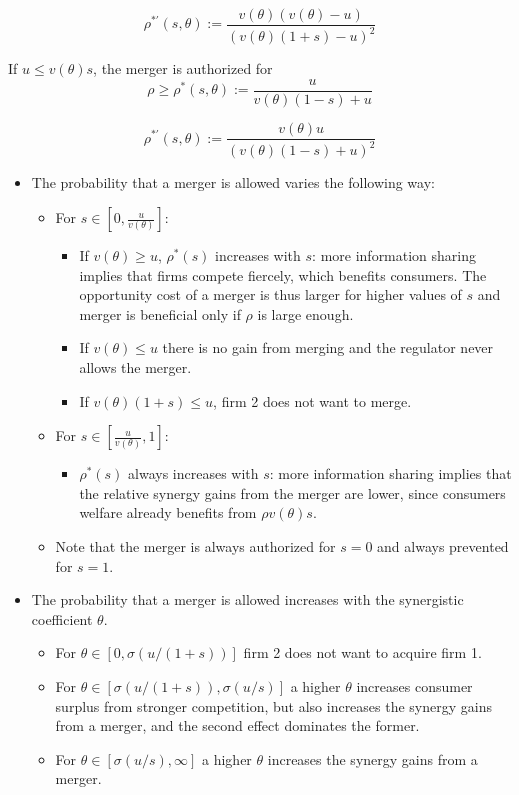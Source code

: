 \documentclass[a4paper,leqno]{article}%
\renewcommand{\t}{\theta}
\newcommand{\s}{\sigma}
\begin{document}
\[
\rho^{*'}(s,\t):=\frac{v(\t)(v(\t)-u)}{(v(\t)(1+s)-u)^2}
\]
    
If $u\leq v(\t)s$, the merger is authorized for 
    \begin{equation}
           \rho\geq \rho^*(s,\t):=\frac{u}{v(\t)(1-s)+u}
    \end{equation}


\[
\rho^{*'}(s,\t):=\frac{v(\t)u}{(v(\t)(1-s)+u)^2}
\]


\begin{itemize}
    \item The probability that a merger is allowed varies the following way:
    \begin{itemize}
        \item For $s\in[0,\frac{u}{v(\t)}]$:
        \begin{itemize}
            \item If $v(\t)\geq u$, $\rho^*(s)$ increases with $s$: more information sharing implies that firms compete fiercely, which benefits consumers. The opportunity cost of a merger is thus larger for higher values of $s$ and merger is beneficial only if $\rho$ is large enough.
            \item If $v(\t)\leq u$ there is no gain from merging and the regulator never allows the merger.
            \item If $v(\t)(1+s)\leq u$, firm 2 does not want to merge.
        \end{itemize}
        \item For $s\in[\frac{u}{v(\t)},1]$:
        \begin{itemize}
            \item $\rho^*(s)$ always increases with $s$: more information sharing implies that the relative synergy gains from the merger are lower, since consumers welfare already benefits from $\rho v(\t)s$.
        \end{itemize}
        \item Note that the merger is always authorized for $s=0$ and always prevented for $s=1$.
    \end{itemize} 
    \item The probability that a merger is allowed increases with the synergistic coefficient $\t$. 
    \begin{itemize}
        \item For $\t\in[0,\s(u/(1+s))]$ firm 2 does not want to acquire firm 1.
        \item For $\t\in[\s(u/(1+s)),\s(u/s)]$ a higher $\t$ increases consumer surplus from stronger competition, but also increases the synergy gains from a merger, and the second effect dominates the former.
        \item For $\t\in[\s(u/s),\infty]$ a higher $\t$ increases the synergy gains from a merger.
    \end{itemize} 
\end{itemize}
\end{document}
